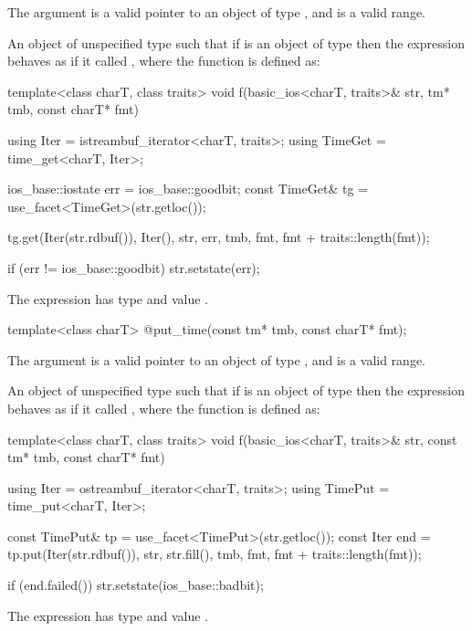\begin{itemdescr}
\pnum
\expects
The argument  is a valid pointer to an object of type ,
and  is a valid range.

\pnum
\returns
An object of unspecified type such that if  is an object of type
 then the expression  behaves as if it called , where the function  is
defined as:

\begin{codeblock}
template<class charT, class traits>
void f(basic_ios<charT, traits>& str, tm* tmb, const charT* fmt) {
  using Iter    = istreambuf_iterator<charT, traits>;
  using TimeGet = time_get<charT, Iter>;

  ios_base::iostate err = ios_base::goodbit;
  const TimeGet& tg = use_facet<TimeGet>(str.getloc());

  tg.get(Iter(str.rdbuf()), Iter(), str, err, tmb,
    fmt, fmt + traits::length(fmt));

  if (err != ios_base::goodbit)
    str.setstate(err);
}
\end{codeblock}

The expression  has type
 and value .
\end{itemdescr}

%
\begin{itemdecl}
template<class charT> @\unspec@ put_time(const tm* tmb, const charT* fmt);
\end{itemdecl}

\begin{itemdescr}
\pnum
\expects
The argument  is a valid pointer to an object of type ,
and  is a valid range.

\pnum
\returns
An object of unspecified type such that if  is an object of
type  then the expression
 behaves as if it called ,
where the function  is defined as:

\begin{codeblock}
template<class charT, class traits>
void f(basic_ios<charT, traits>& str, const tm* tmb, const charT* fmt) {
  using Iter    = ostreambuf_iterator<charT, traits>;
  using TimePut = time_put<charT, Iter>;

  const TimePut& tp = use_facet<TimePut>(str.getloc());
  const Iter end = tp.put(Iter(str.rdbuf()), str, str.fill(), tmb,
    fmt, fmt + traits::length(fmt));

  if (end.failed())
    str.setstate(ios_base::badbit);
}
\end{codeblock}

The expression  has type
 and value .
\end{itemdescr}

